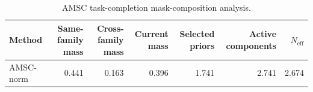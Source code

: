 \begin{table}[ht]
    \caption{AMSC task-completion mask-composition analysis.}
    \label{tbl:amsc_composition}
    \centering
    \scriptsize
    \begin{tabular}{lrrrrrr}
    \toprule
Method & Same-family mass & Cross-family mass & Current mass & Selected priors & Active components & $N_{\mathrm{eff}}$ \\
    \midrule
AMSC-norm & 0.441 & 0.163 & 0.396 & 1.741 & 2.741 & 2.674 \\
    \bottomrule
    \end{tabular}
\end{table}
